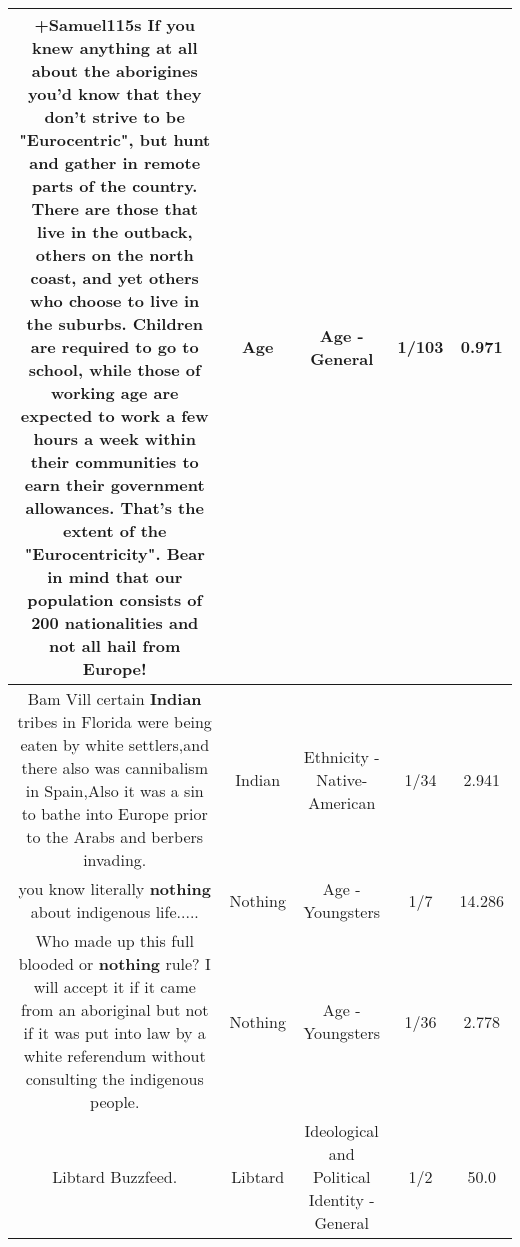 \documentclass[11pt]{article}
\newlength\mylength
\begin{document}
\begin{center}
\begin{longtable}{|C{.65\mylength}|C{.30\mylength}|C{.12\mylength}|C{.12\mylength}|C{.12\mylength}|}
  \small +Samuel115s  If you knew anything at all about the aborigines you'd know that they don't strive to be "Eurocentric", but hunt and gather in remote parts of the country.  There are those that live in the outback, others on the north coast, and yet others who choose to live in the suburbs.  Children are required to go to school, while those of working \textbf{age} are expected to work a few hours a week within their communities to earn their government allowances.  That's the extent of the "Eurocentricity".  Bear in mind that our population consists of 200 nationalities and not all hail from Europe!\normalsize   & Age & Age - General & 1/103 & 0.971 \\  \hline
  \small Bam Vill certain \textbf{Indian} tribes in Florida were being eaten by white settlers,and there also was cannibalism in Spain,Also it was a sin to bathe into Europe prior to the Arabs and berbers invading.\normalsize   & Indian & Ethnicity - Native-American & 1/34 & 2.941 \\  \hline
  \small you know literally \textbf{nothing} about indigenous life.....\normalsize   & Nothing & Age - Youngsters & 1/7 & 14.286 \\  \hline
  \small Who made up this full blooded or \textbf{nothing} rule? I will accept it if it came from an aboriginal but not if it was put into law by a white referendum without consulting the indigenous people.\normalsize   & Nothing & Age - Youngsters & 1/36 & 2.778 \\  \hline
  \small Libtard Buzzfeed.\normalsize   & Libtard &  Ideological and Political Identity - General & 1/2 & 50.0 \\  \hline

\end{longtable}
\end{center}
\end{document}
